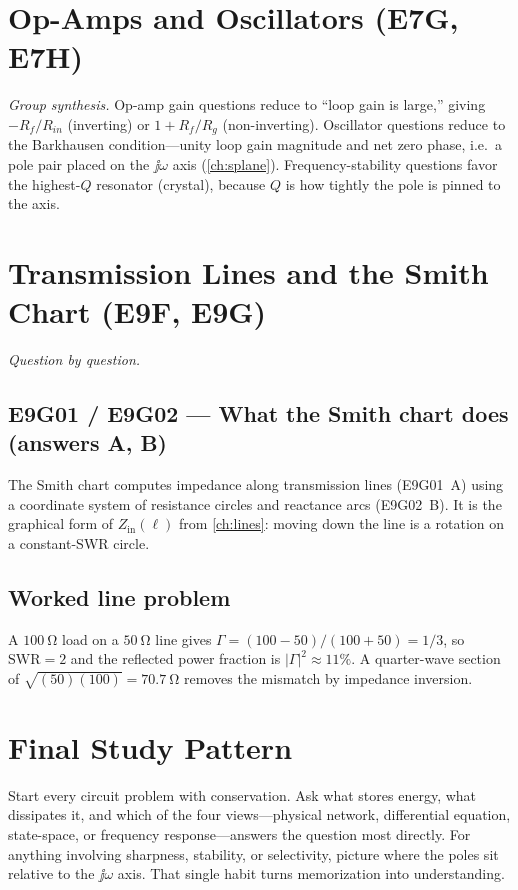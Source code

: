 \section{Op-Amps and Oscillators (E7G, E7H)}
\emph{Group synthesis.}
Op-amp gain questions reduce to ``loop gain is large,'' giving
\(-R_f/R_{in}\) (inverting) or \(1+R_f/R_g\) (non-inverting). Oscillator questions
reduce to the Barkhausen condition---unity loop gain magnitude and net zero
phase, i.e.\ a pole pair placed on the \(\jj\omega\) axis
(\cref{ch:splane}). Frequency-stability questions favor the highest-\(Q\)
resonator (crystal), because \(Q\) is how tightly the pole is pinned to the axis.

\section{Transmission Lines and the Smith Chart (E9F, E9G)}
\emph{Question by question.}

\subsection*{E9G01 / E9G02 --- What the Smith chart does (answers A, B)}
The Smith chart computes impedance along transmission lines (E9G01~A) using a
coordinate system of resistance circles and reactance arcs (E9G02~B). It is the
graphical form of \(Z_{\mathrm{in}}(\ell)\) from \cref{ch:lines}: moving down the
line is a rotation on a constant-SWR circle.

\subsection*{Worked line problem}
A \(\SI{100}{\ohm}\) load on a \(\SI{50}{\ohm}\) line gives
\(\Gamma=(100-50)/(100+50)=1/3\), so \(\mathrm{SWR}=2\) and the reflected power
fraction is \(|\Gamma|^2\approx11\%\). A quarter-wave section of
\(\sqrt{(50)(100)}=\SI{70.7}{\ohm}\) removes the mismatch by impedance inversion.

\section{Final Study Pattern}
Start every circuit problem with conservation. Ask what stores energy, what
dissipates it, and which of the four views---physical network, differential
equation, state-space, or frequency response---answers the question most directly. For anything
involving sharpness, stability, or selectivity, picture where the poles sit
relative to the \(\jj\omega\) axis. That single habit turns memorization into
understanding.
